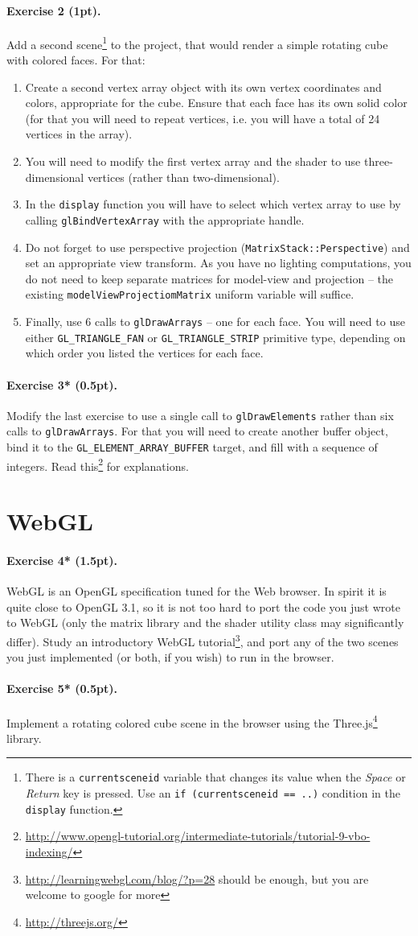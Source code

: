 \documentclass{article}
\newenvironment{exercise}[2]{\paragraph{Exercise #1 (#2pt).} }{
\medskip}
\begin{document}
\begin{exercise}{2}{1}
Add a second scene\footnote{There is a \texttt{current\textunderscore scene\textunderscore id} variable that changes its value when the \emph{Space} or \emph{Return} key is pressed. Use an \texttt{if (current\textunderscore scene\textunderscore id == ..)} condition in the \texttt{display} function.} to the project, that would render a simple rotating cube with colored faces. For that:
\begin{enumerate}
\item Create a second vertex array object with its own vertex coordinates and colors, appropriate for the cube. Ensure that each face has its own solid color (for that you will need to repeat vertices, i.e. you will have a total of 24 vertices in the array).
\item You will need to modify the first vertex array and the shader to use three-dimensional vertices (rather than two-dimensional).
\item In the \texttt{display} function you will have to select which vertex array to use by calling \texttt{glBindVertexArray} with the appropriate handle.
\item Do not forget to use perspective projection (\texttt{MatrixStack::Perspective}) and set an appropriate view transform. As you have no lighting computations, you do not need to keep separate matrices for model-view and projection -- the existing \texttt{modelViewProjectiomMatrix} uniform variable will suffice.
\item Finally, use 6 calls to \verb#glDrawArrays# -- one for each face. You will need to use either \verb#GL_TRIANGLE_FAN# or \verb#GL_TRIANGLE_STRIP# primitive type, depending on which order you listed the vertices for each face.
\end{enumerate}
\end{exercise}

\begin{exercise}{3*}{0.5}
Modify the last exercise to use a single call to \verb#glDrawElements# rather than six calls to \verb#glDrawArrays#. For that you will need to create another buffer object, bind it to the \verb#GL_ELEMENT_ARRAY_BUFFER# target, and fill with a sequence of integers. Read this\footnote{\url{http://www.opengl-tutorial.org/intermediate-tutorials/tutorial-9-vbo-indexing/}} for explanations.
\end{exercise}

\section{WebGL}
\begin{exercise}{4*}{1.5}
WebGL is an OpenGL specification tuned for the Web browser. In spirit it is quite close to OpenGL 3.1, so it is not too hard to port the code you just wrote to WebGL (only the matrix library and the shader utility class may significantly differ). Study an introductory WebGL tutorial\footnote{\url{http://learningwebgl.com/blog/?p=28} should be enough, but you are welcome to google for more}, and port any of the two scenes you just implemented (or both, if you wish) to run in the browser.
\end{exercise}

\begin{exercise}{5*}{0.5}
Implement a rotating colored cube scene in the browser using the Three.js\footnote{\url{http://threejs.org/}} library.
\end{exercise}
\end{document}
